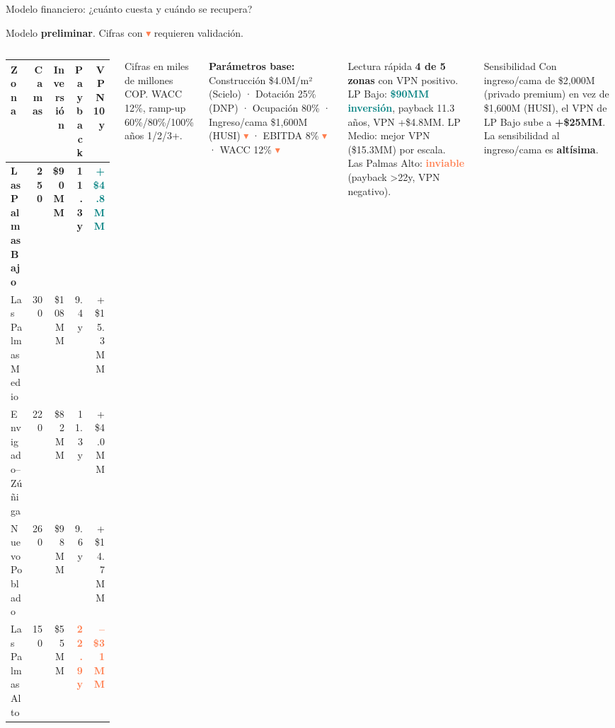\documentclass[aspectratio=169, 11pt]{beamer}
\newcommand{\highlight}[1]{\textcolor{teal}{\textbf{#1}}}
\newcommand{\danger}[1]{\textcolor{coral}{\textbf{#1}}}
\begin{document}
\begin{frame}{Modelo financiero: ¿cuánto cuesta y cuándo se recupera?}

{\footnotesize Modelo \textbf{preliminar}. Cifras con {\textcolor{coral}{$\blacktriangledown$}} requieren validación.}

\vspace{4pt}
\begin{columns}[T]

{\footnotesize
\begin{tabular}{@{}l r r r r@{}}
\toprule
\textbf{Zona} & \textbf{Camas} & \textbf{Inversión} & \textbf{Payback} & \textbf{VPN 10y} \\
\midrule
\rowcolor{teal!10}
\textbf{Las Palmas Bajo} & \textbf{250} & \textbf{\$90MM} & \textbf{11.3y} & \highlight{+\$4.8MM} \\
Las Palmas Medio & 300 & \$108MM & 9.4y & +\$15.3MM \\
Envigado--Zúñiga & 220 & \$82MM & 11.3y & +\$4.0MM \\
Nuevo Poblado & 260 & \$98MM & 9.6y & +\$14.7MM \\
\rowcolor{coral!8}
Las Palmas Alto & 150 & \$55MM & \danger{22.9y} & \danger{--\$31MM} \\
\bottomrule
\end{tabular}
}

\vspace{3pt}
{\tiny Cifras en miles de millones COP. WACC 12\%, ramp-up 60\%/80\%/100\% años 1/2/3+.}

\vspace{6pt}
{\scriptsize\textbf{Parámetros base:}
Construcción \$4.0M/m² (Scielo) · Dotación 25\% (DNP) · Ocupación 80\% · Ingreso/cama \$1,600M (HUSI) {\textcolor{coral}{$\blacktriangledown$}} · EBITDA 8\% {\textcolor{coral}{$\blacktriangledown$}} · WACC 12\% {\textcolor{coral}{$\blacktriangledown$}}
}

\begin{exampleblock}{\small Lectura rápida}
\footnotesize
\textbf{4 de 5 zonas} con VPN positivo. LP Bajo: \highlight{\$90MM inversión}, payback 11.3 años, VPN +\$4.8MM. LP Medio: mejor VPN (\$15.3MM) por escala.\\[3pt]
Las Palmas Alto: \danger{inviable} (payback >22y, VPN negativo).
\end{exampleblock}

\vspace{4pt}
\begin{alertblock}{\small Sensibilidad}
\footnotesize Con ingreso/cama de \$2,000M (privado premium) en vez de \$1,600M (HUSI), el VPN de LP Bajo sube a \textbf{+\$25MM}. La sensibilidad al ingreso/cama es \textbf{altísima}.
\end{alertblock}
\end{columns}
\end{frame}
\end{document}
